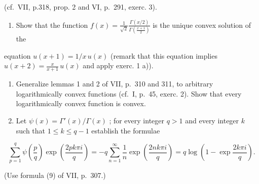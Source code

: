 (cf.~VII, p.318, prop. 2 and VI, p.~291, exerc. 3).

\begin{enumerate}
\def\labelenumi{\arabic{enumi})}
\setcounter{enumi}{3}
\tightlist
\item
  Show that the function \(f(x) = \frac{1}{\sqrt{2}}\frac{\Gamma(x / 2)}{\Gamma\left(\frac{x + 1}{2}\right)}\) is the unique convex solution of the
\end{enumerate}

equation \(u(x + 1) = 1 / x \, u(x)\) (remark that this equation implies \(u(x + 2) = \frac{x}{x + 1} \, u(x)\) and apply exerc. 1 a)).

\begin{enumerate}
\def\labelenumi{\arabic{enumi})}
\setcounter{enumi}{4}
\item
  Generalize lemmas 1 and 2 of VII, p.~310 and 311, to arbitrary logarithmically convex functions (cf.~I, p.~45, exerc. 2). Show that every logarithmically convex function is convex.
\item
  Let \(\psi(x) = \Gamma'(x)/\Gamma(x)\) ; for every integer \(q > 1\) and every integer \(k\) such that \(1 \leqslant k \leqslant q - 1\) establish the formulae
\end{enumerate}

\[
\sum_ {p = 1} ^ {q} \psi \left(\frac {p}{q}\right) \exp \left(\frac {2 p k \pi i}{q}\right) = - q \sum_ {n = 1} ^ {\infty} \frac {1}{n} \exp \left(\frac {2 n k \pi i}{q}\right) = q \log \left(1 - \exp \frac {2 k \pi i}{q}\right).
\]

(Use formula (9) of VII, p.~307.)

\setcounter{exercisegroup}{1}
